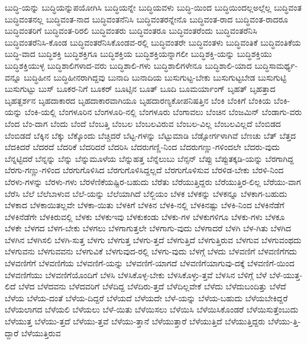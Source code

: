{ಬುದ್ಧಿ-ಯನ್ನು
ಬುದ್ಧಿಯನ್ನುಪಯೋಗಿಸಿ
ಬುದ್ಧಿಯನ್ನೇ
ಬುದ್ಧಿಯವಳು
ಬುದ್ಧಿ-ಯಿಂದ
ಬುದ್ಧಿಯಿಂದಲ್ಲಅಲ್ಲೆಲ್ಲ
ಬುದ್ಧಿವಂತ
ಬುದ್ಧಿವಂತನಲ್ಲ
ಬುದ್ಧಿವಂತ-ನಾದ
ಬುದ್ಧಿವಂತನೆನಿಸಿ
ಬುದ್ಧಿವಂತರನ್ನೇನೊ
ಬುದ್ಧಿವಂತ-ರಾದ
ಬುದ್ಧಿವಂತ-ರಾದರೂ
ಬುದ್ಧಿವಂತರಿಗೆ
ಬುದ್ಧಿವಂತ-ರಿರಲಿ
ಬುದ್ಧಿವಂತರು
ಬುದ್ಧಿವಂತರೂ
ಬುದ್ಧಿವಂತರೆಂದು
ಬುದ್ಧಿವಂತರೆನಿಸಿ
ಬುದ್ಧಿವಂತರೆನಿಸಿ-ಕೊಂಡ
ಬುದ್ಧಿವಂತರೆನಿಸಿಕೊಂಡವ-ರಲ್ಲಿ
ಬುದ್ಧಿವಂತರೇ
ಬುದ್ಧಿವಂತಳು
ಬುದ್ಧಿವಂತಿಕೆ
ಬುದ್ಧಿವಂತಿಕೆಯ
ಬುದ್ಧಿ-ವಾದ
ಬುದ್ಧಿಶಕ್ತಿ
ಬುದ್ಧಿಶಕ್ತಿಗೂ
ಬುದ್ಧಿಶಕ್ತಿಯ
ಬುದ್ಧಿಶಕ್ತಿಯನ್ನಾಗಲೀ
ಬುದ್ಧಿಶಕ್ತಿ-ಯನ್ನು
ಬುದ್ಧಿಶಕ್ತಿಯು
ಬುದ್ಧಿಶಕ್ತಿಯುಳ್ಳ
ಬುದ್ಧಿಶಾಲಿಗಳಾದ-ವರು
ಬುದ್ಧಿಶಾಲಿ-ಗಳು
ಬುದ್ಧಿಶಾಲಿಗಳೇನೂ
ಬುದ್ಧಿಶಾಲಿ-ಯಾದ
ಬುದ್ಧಿಸಾಮರ್ಥ್ಯ-ವನ್ನೂ
ಬುದ್ಧಿಹೀನ
ಬುದ್ಧಿಹೀನರಾಗಿದ್ದವು
ಬುನಾದಿ
ಬುನಾದಿಯ
ಬುಸುಗುಟ್ಟ-ಬೇಕು
ಬುಸುಗುಟ್ಟಬೇಡ
ಬುಸುಗುಟ್ಟಿ
ಬುಸುಗುಟ್ಟು
ಬುಸ್
ಬೂಕರ-ನಿಗೆ
ಬೂಕರ್
ಬೂಟ್ಸಿನ
ಬೂತ್
ಬೂದಿ
ಬೂಮರ್ಯಾಂಗ್
ಬೃಹತ್
ಬೃಹತ್ತಾದ
ಬೃಹತ್ದರ್ಶನ
ಬೃಹದಾಕಾರದ
ಬೃಹದಾಕಾರವಾಗಿಯೂ
ಬೃಹದಾರಣ್ಯಕೋಪನಿಷತ್ತಿನ
ಬೆಂಕಿ
ಬೆಂಕಿಗೆ
ಬೆಂಕಿಯ
ಬೆಂಕಿ-ಯನ್ನು
ಬೆಂಕಿ-ಯಲ್ಲಿ
ಬೆಂಗಳೂರಿನ
ಬೆಂಗಳೂರಿ-ನಲ್ಲಿ
ಬೆಂಗಳೂರು
ಬೆಂಗಾವಲು
ಬೆಂಚಿನ
ಬೆಂಜಮಿನ್
ಬೆಂಡಾಗು-ವರು
ಬೆಂದ
ಬೆಂ-ದಾಗ
ಬೆಂದು
ಬೆಂದೆ
ಬೆಂಬತ್ತಿ
ಬೆಂಬಲ
ಬೆಂಬಲವಿರುವ
ಬೆಂಬಲ-ವಿಲ್ಲ
ಬೆಂಬಲವಿಲ್ಲದೆ
ಬೆಂಬಿಡದ
ಬೆಂಬಿಡದೆ
ಬೆಕ್ಕಿನ
ಬೆಕ್ಕು
ಬೆಕ್ಕೊಂದು
ಬೆಚ್ಚಿದರೆ
ಬೆಟ್ಟ-ಗಳನ್ನು
ಬೆಟ್ಟುಮಾಡಿ
ಬೆಡ್ಸೋರ್ಗಳಾಗಿವೆ
ಬೆಣಚು
ಬೆತ್
ಬೆತ್ತದ
ಬೆದಕಿದರೆ
ಬೆದರದೆ
ಬೆದರಿಕೆ
ಬೆದರಿದರೆ
ಬೆದರಿಸಿ
ಬೆದರುಗಣ್ಣಿ-ನಿಂದ
ಬೆದರುಗಣ್ಣು-ಗಳಿಂದಲೇ
ಬೆದರು-ವುದು
ಬೆನ್ನಟ್ಟಿದರೆ
ಬೆನ್ನನ್ನು
ಬೆನ್ನು
ಬೆನ್ನುಮೂಳೆಯ
ಬೆನ್ನುಹತ್ತ
ಬೆನ್ನೆಲುಬು
ಬೆನ್ಸನ್
ಬೆಪ್ಪು
ಬೆಪ್ಪುತಕ್ಕಡಿ-ಯನ್ನು
ಬೆರಗಾಗಿದ್ದ
ಬೆರಗು-ಗಣ್ಣು-ಗಳಿಂದ
ಬೆರಗುಗೊಳಿಸಿದ
ಬೆರಗುಗೊಳಿಸಿದ್ದಲ್ಲದೆ
ಬೆರಗುಗೊಳಿಸುವ
ಬೆರಳಿಡ-ಬೇಕು
ಬೆರಳಿ-ನಿಂದ
ಬೆರಳು-ಗಳನ್ನು
ಬೆರಳು-ಗಳು
ಬೆರಳೆಣಿಕೆಯಷ್ಟಿರ-ಬಹುದು
ಬೆರೆತು
ಬೆರೆಯುತ್ತಿದ್ದರು
ಬೆರೆಯುತ್ತಿರ-ಲಿಲ್ಲ
ಬೆರೆಯು-ವಾಗ
ಬೆರೆಸಿ
ಬೆಲೆ
ಬೆಲೆಬಾಳುವ
ಬೆಲೆ-ಯನ್ನು
ಬೆಲೆಯಾಗಿದೆ
ಬೆಲ್ಜಿಯಂ
ಬೆಳಕ
ಬೆಳಕನ್ನು
ಬೆಳಕನ್ನೂ
ಬೆಳಕಾಗ-ಬಹುದು
ಬೆಳಕಾದ
ಬೆಳಕಾಯಿತಲ್ಲವೇ
ಬೆಳಕಾ-ಯಿತು
ಬೆಳಕಿಗೆ
ಬೆಳಕಿನ
ಬೆಳಕಿ-ನಲ್ಲಿ
ಬೆಳಕಿನಷ್ಟು
ಬೆಳಕಿ-ನಿಂದ
ಬೆಳಕಿನೆಡೆಗೆ
ಬೆಳಕಿನೆಡೆಗೇ
ಬೆಳಕಿರುವಲ್ಲಿ
ಬೆಳಕು
ಬೆಳಕುಇವು
ಬೆಳಕುಕಂಡು
ಬೆಳಕು-ಗಳ
ಬೆಳಕುಗಳಿಗೂ
ಬೆಳಕು-ಗಳು
ಬೆಳಕೂ
ಬೆಳಕೇ
ಬೆಳಗದ
ಬೆಳಗ-ಬೇಕು
ಬೆಳಗಲು
ಬೆಳಗಾಗುತ್ತಲೇ
ಬೆಳಗಾಗು-ವುದು
ಬೆಳಗಾದರೆ
ಬೆಳಗಿ
ಬೆಳ-ಗಿತು
ಬೆಳಗಿದ
ಬೆಳಗಿನ
ಬೆಳಗಿಸಲಿ
ಬೆಳಗಿ-ಸುತ್ತ
ಬೆಳಗು
ಬೆಳಗುತ್ತ
ಬೆಳಗು-ತ್ತದೆ
ಬೆಳಗುತ್ತಿದೆ
ಬೆಳಗುತ್ತಿರುವ
ಬೆಳಗುವ
ಬೆಳಗುವಂಥದು
ಬೆಳಗುವನು
ಬೆಳಗುವವನು
ಬೆಳಗುವಿಕೆ
ಬೆಳಗುವುದ-ರಲ್ಲಿ
ಬೆಳಗು-ವುದು
ಬೆಳಗ್ಗೆ
ಬೆಳದು
ಬೆಳವಣಿಗೆ
ಬೆಳವಣಿಗೆಗದು
ಬೆಳವಣಿಗೆಗೆ
ಬೆಳವಣಿಗೆಯ
ಬೆಳವಣಿಗೆ-ಯನ್ನು
ಬೆಳವಣಿಗೆ-ಯಾಗದೆ
ಬೆಳವಣಿಗೆಯಾಗುವು-ದಕ್ಕೆ
ಬೆಳವಣಿಗೆ-ಯಿಂದ
ಬೆಳವಣಿಗೆಯು
ಬೆಳವಣಿಗೆಯೊಂದಿಗೆ
ಬೆಳಸಿ
ಬೆಳಸಿಕೊಳ್ಳ-ಬೇಕು
ಬೆಳಸಿಕೊಳ್ಳು-ತ್ತವೆ
ಬೆಳಸಿನ
ಬೆಳಿಗ್ಗೆ
ಬೆಳೆ
ಬೆಳೆ-ಯುತ್ತ-ಲಿದೆ
ಬೆಳೆದ
ಬೆಳೆದವನು
ಬೆಳೆದವರಿಗೆ
ಬೆಳೆದಿದ್ದ
ಬೆಳೆದಿರು-ತ್ತದೆ
ಬೆಳೆದಿಲ್ಲವೇಕೆ
ಬೆಳೆದು
ಬೆಳೆದುಬಂದಿತ್ತು
ಬೆಳೆದೆ
ಬೆಳೆಯ
ಬೆಳೆಯ-ದಂತೆ
ಬೆಳೆಯ-ದಿದ್ದರೆ
ಬೆಳೆಯದೆ
ಬೆಳೆಯದೇ
ಬೆಳೆ-ಯನ್ನು
ಬೆಳೆಯ-ಬಹುದು
ಬೆಳೆಯಬೇಕಿದ್ದರೆ
ಬೆಳೆಯಲಾಗದ
ಬೆಳೆಯಲಿ
ಬೆಳೆಯಲು
ಬೆಳೆ-ಯಿತು
ಬೆಳೆಯಿಸಲು
ಬೆಳೆಯಿಸಿ
ಬೆಳೆಯಿಸಿಕೊಂಡರೆ
ಬೆಳೆಯಿಸುತ್ತೆಂಬುದು
ಬೆಳೆಯುತ್ತ
ಬೆಳೆಯು-ತ್ತದೆ
ಬೆಳೆಯು-ತ್ತವೆ
ಬೆಳೆಯು-ತ್ತಾನೆ
ಬೆಳೆಯುತ್ತಾರೆ
ಬೆಳೆಯುತ್ತಿದೆ
ಬೆಳೆಯುತ್ತಿದ್ದರು
ಬೆಳೆಯು-ತ್ತಿ-ದ್ದಾರೆ
ಬೆಳೆಯುತ್ತಿರುವ
}
